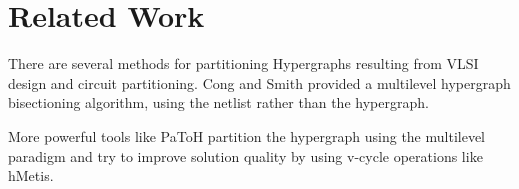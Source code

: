 \documentclass[a4paper,12pt,bibtotoc,titlepage, liststotoc,BCOR7mm,headsepline,pointlessnumbers]{scrbook}
\numberwithin{equation}{section}
\begin{document}
\section{Related Work}

There are several methods for partitioning Hypergraphs resulting from VLSI design and circuit partitioning. Cong and Smith \cite{cong1993parallel} provided a multilevel hypergraph bisectioning algorithm, using the netlist rather than the hypergraph. 

More powerful tools like PaToH \cite{catalyurek1999hypergraph} partition the hypergraph using the multilevel paradigm and try to improve solution quality by using v-cycle operations like hMetis\cite{karypis1999multilevel}. 
\end{document}
